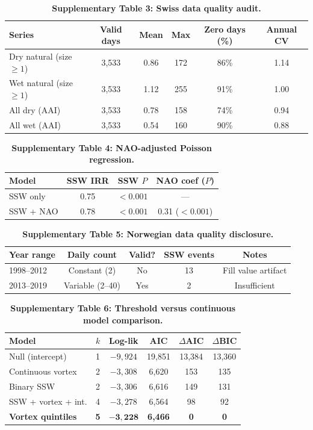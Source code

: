 \documentclass[11pt,a4paper]{article}
\begin{document}
\begin{table}[!ht]
\centering
\caption{\textbf{Supplementary Table 3: Swiss data quality audit.}}
\label{stab:quality}
\small
\begin{tabular}{lccccc}
\toprule
Series & Valid days & Mean & Max & Zero days (\%) & Annual CV \\
\midrule
Dry natural (size $\geq 1$) & 3,533 & 0.86 & 172 & 86\% & 1.14 \\
Wet natural (size $\geq 1$) & 3,533 & 1.12 & 255 & 91\% & 1.00 \\
All dry (AAI) & 3,533 & 0.78 & 158 & 74\% & 0.94 \\
All wet (AAI) & 3,533 & 0.54 & 160 & 90\% & 0.88 \\
\bottomrule
\end{tabular}
\end{table}

\begin{table}[!ht]
\centering
\caption{\textbf{Supplementary Table 4: NAO-adjusted Poisson regression.}}
\label{stab:nao}
\small
\begin{tabular}{lccc}
\toprule
Model & SSW IRR & SSW $P$ & NAO coef ($P$) \\
\midrule
SSW only & 0.75 & $< 0.001$ & --- \\
SSW + NAO & 0.78 & $< 0.001$ & 0.31 ($< 0.001$) \\
\bottomrule
\end{tabular}
\end{table}

\begin{table}[!ht]
\centering
\caption{\textbf{Supplementary Table 5: Norwegian data quality disclosure.}}
\label{stab:norway_quality}
\small
\begin{tabular}{lcccc}
\toprule
Year range & Daily count & Valid? & SSW events & Notes \\
\midrule
1998--2012 & Constant (2) & No & 13 & Fill value artifact \\
2013--2019 & Variable (2--40) & Yes & 2 & Insufficient \\
\bottomrule
\end{tabular}
\end{table}

\begin{table}[!ht]
\centering
\caption{\textbf{Supplementary Table 6: Threshold versus continuous model comparison.}}
\label{stab:model}
\small
\begin{tabular}{lccccc}
\toprule
Model & $k$ & Log-lik & AIC & $\Delta$AIC & $\Delta$BIC \\
\midrule
Null (intercept) & 1 & $-9{,}924$ & 19,851 & 13,384 & 13,360 \\
Continuous vortex & 2 & $-3{,}308$ & 6,620 & 153 & 135 \\
Binary SSW & 2 & $-3{,}306$ & 6,616 & 149 & 131 \\
SSW + vortex + int. & 4 & $-3{,}278$ & 6,564 & 98 & 92 \\
\textbf{Vortex quintiles} & \textbf{5} & $\mathbf{-3{,}228}$ & \textbf{6,466} & \textbf{0} & \textbf{0} \\
\bottomrule
\end{tabular}
\end{table}
\end{document}
